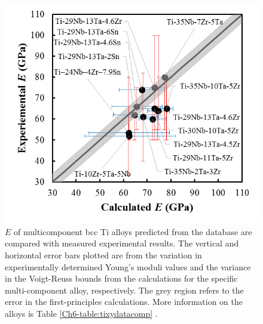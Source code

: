 \pagebreak
\begin{figure}[H]
	\centering
	\includegraphics{Chapter-6/Figures/tixydatabase.png}
	\caption{$E$ of multicomponent bcc Ti alloys predicted from the database are compared with measured experimental results. The vertical and horizontal error bars plotted are from the variation in experimentally determined Young's moduli values and the variance in the Voigt-Reuss bounds from the calculations for the specific multi-component alloy, respectively. The grey region refers to the error in the first-principles calculations. More information on the alloys is Table \ref{Ch6-table:tixydatacomp} \cite{Mohammed2014,Geetha2009,Tane2010a}.}
	\label{Ch6-figure:tixydatabase}
\end{figure}